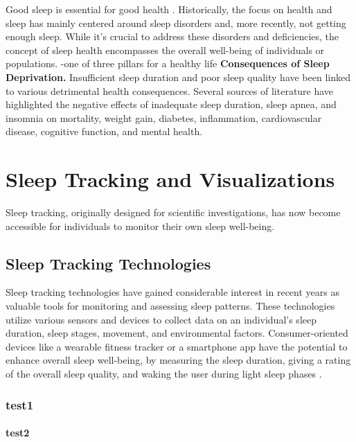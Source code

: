\documentclass[
  a4paper,  %
  twoside,  %
  bibliography=totoc,
  headsepline,
  cleardoublepage=empty,
  parskip=half,
  draft=false
]{scrbook}
\begin{document}
Good sleep is essential for good health \cite{buysse_sleep_2014, grandner_sleep_2017, ramar_sleep_2021}. Historically, the focus on health and sleep has mainly centered around sleep disorders and, more recently, not getting enough sleep. While it's crucial to address these disorders and deficiencies, the concept of sleep health encompasses the overall well-being of individuals or populations\cite{buysse_sleep_2014}.
\newline
-one of three pillars for a healthy life
\newline
\newline
\textbf{Consequences of Sleep Deprivation.}
Insufficient sleep duration and poor sleep quality have been linked to various detrimental health consequences. Several sources of literature have highlighted the negative effects of inadequate sleep duration, sleep apnea, and insomnia on mortality, weight gain, diabetes, inflammation, cardiovascular disease, cognitive function, and mental health. \cite{grandner_sleep_2017}

\section{Sleep Tracking and Visualizations}
Sleep tracking, originally designed for scientific investigations, has now become accessible for individuals to monitor their own sleep well-being. 
\subsection{Sleep Tracking Technologies}
Sleep tracking technologies have gained considerable interest in recent years as valuable tools for monitoring and assessing sleep patterns. These technologies utilize various sensors and devices to collect data on an individual's sleep duration, sleep stages, movement, and environmental factors. Consumer-oriented devices like a wearable fitness tracker or a smartphone app have the potential to enhance overall sleep well-being, by measuring the sleep duration, giving a rating of the overall sleep quality, and waking the user during light sleep phases \cite{kolla_consumer_2016}.
\newline
\newline
\subsubsection{test1}
\paragraph{test2}
\end{document}
